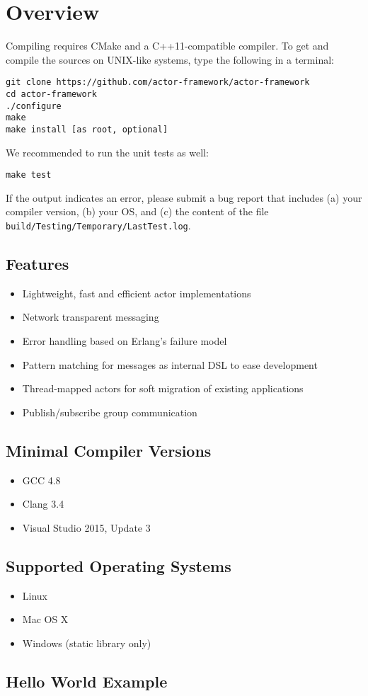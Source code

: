 \section{Overview}

Compiling \lib requires CMake and a C++11-compatible compiler. To get and compile the sources on UNIX-like systems, type the following in a terminal:

\begin{verbatim}
git clone https://github.com/actor-framework/actor-framework
cd actor-framework
./configure
make
make install [as root, optional]
\end{verbatim}

We recommended to run the unit tests as well:

\begin{verbatim}
make test
\end{verbatim}

If the output indicates an error, please submit a bug report that includes (a) your compiler version, (b) your OS, and (c) the content of the file \texttt{build/Testing/Temporary/LastTest.log}.

\subsection{Features}

\begin{itemize}
  \item Lightweight, fast and efficient actor implementations
  \item Network transparent messaging
  \item Error handling based on Erlang's failure model
  \item Pattern matching for messages as internal DSL to ease development
  \item Thread-mapped actors for soft migration of existing applications
  \item Publish/subscribe group communication
\end{itemize}


\subsection{Minimal Compiler Versions}

\begin{itemize}
  \item GCC 4.8
  \item Clang 3.4
  \item Visual Studio 2015, Update 3
\end{itemize}

\subsection{Supported Operating Systems}

\begin{itemize}
\item Linux
\item Mac OS X
\item Windows (static library only)
\end{itemize}

\clearpage
\subsection{Hello World Example}


